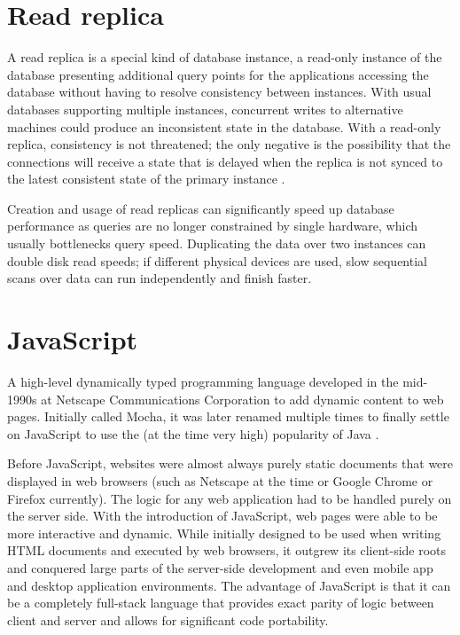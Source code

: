 \section*{Read replica}
A read replica is a special kind of database instance, a read-only instance of
the database presenting additional query points for the applications accessing
the database without having to resolve consistency between instances. With usual
databases supporting multiple instances, concurrent writes to alternative
machines could produce an inconsistent state in the database. With a read-only
replica, consistency is not threatened; the only negative is the possibility
that the connections will receive a state that is delayed when the replica is
not synced to the latest consistent state of the primary instance
\cite{postgres-availability}.

Creation and usage of read replicas can significantly speed up database
performance as queries are no longer constrained by single hardware, which
usually bottlenecks query speed. Duplicating the data over two instances can
double disk read speeds; if different physical devices are used, slow sequential
scans over data can run independently and finish faster.


\section*{JavaScript}
A high-level dynamically typed programming language developed in the mid-1990s
at Netscape Communications Corporation to add dynamic content to web pages.
Initially called Mocha, it was later renamed multiple times to finally settle on
JavaScript to use the (at the time very high) popularity of Java
\cite{auth0JavascriptHistory}.

Before JavaScript, websites were almost always purely static documents that were
displayed in web browsers (such as Netscape at the time or Google Chrome or
Firefox currently). The logic for any web application had to be handled purely
on the server side. With the introduction of JavaScript, web pages were able to
be more interactive and dynamic. While initially designed to be used when
writing HTML documents and executed by web browsers, it outgrew its client-side
roots and conquered large parts of the server-side development and even mobile
app and desktop application environments. The advantage of JavaScript is that it
can be a completely full-stack language that provides exact parity of logic
between client and server and allows for significant code portability.

